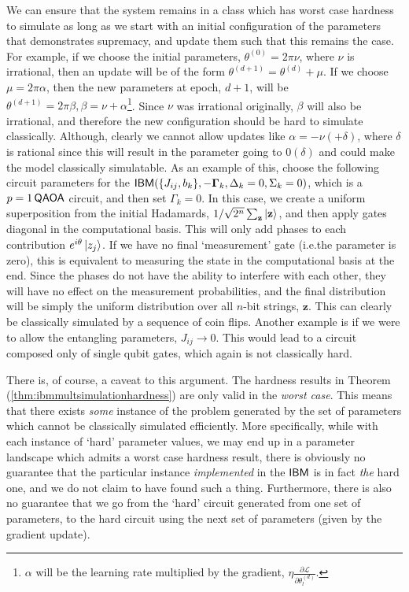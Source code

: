 We can ensure that the system remains in a class which has worst case hardness to simulate as long as we start with an initial configuration of the parameters that demonstrates supremacy, and update them such that this remains the case. For example, if we choose the initial parameters, $\theta^{(0)} = 2\pi\nu$, where $\nu$ is irrational, then an update will be of the form $\theta^{(d+1)} = \theta^{(d)} + \mu$. If we choose $\mu = 2\pi\alpha$, then the new parameters at epoch, $d+1$, will be $\theta^{(d+1)} = 2\pi\beta, \beta = \nu+\alpha$\footnote{$\alpha$ will be the learning rate multiplied by the gradient, $\eta \frac{\partial \mathcal{L}}{\partial \theta^{(d)}_l}$.}. Since $\nu$ was irrational originally, $\beta$ will also be irrational, and therefore the new configuration should be hard to simulate classically. Although, clearly we cannot allow updates like $\alpha = -\nu (+ \delta)$, where $\delta$ is rational since this will result in the parameter going to $0 (\delta)$ and could make the model classically simulatable. As an example of this, choose the following circuit parameters for the $\textsf{IBM}(\{J_{ij}, b_k\}, -\mathbf{\Gamma}_k, \Delta_k = 0, \Sigma_k = 0)$, which is a $p=1 \operatorname{\textsf{QAOA}}$ circuit, and then set $\Gamma_k = 0$. In this case, we create a uniform superposition from the initial Hadamards, $1/\sqrt{2^n}\sum_\mathbf{z}\ket{\mathbf{z}}$, and then apply gates diagonal in the computational basis. This will only add phases to each contribution $e^{i\theta}\ket{z_j}$. If we have no final `measurement' gate (i.e.\@ the parameter is zero), this is equivalent to measuring the state in the computational basis at the end. Since the phases do not have the ability to interfere with each other, they will have no effect on the measurement probabilities, and the final distribution will be simply the uniform distribution over all $n$-bit strings, $\mathbf{z}$. This can clearly be classically simulated by a sequence of coin flips. Another example is if we were to allow the entangling parameters, $J_{ij} \rightarrow 0$. This would lead to a circuit composed only of single qubit gates, which again is not classically hard.

There is, of course, a caveat to this argument. The hardness results in Theorem (\ref{thm:ibmmultsimulationhardness}) are only valid in the \textit{worst case}. This means that there exists \textit{some} instance of the problem generated by the set of parameters which cannot be classically simulated efficiently. More specifically, while with each instance of `hard' parameter values, we may end up in a parameter landscape which admits a worst case hardness result, there is obviously no guarantee that the particular instance \textit{implemented} in the $\textsf{IBM}$ is in fact \textit{the} hard one, and we do not claim to have found such a thing. Furthermore, there is also no guarantee that we go from the `hard' circuit generated from one set of parameters, to the hard circuit using the next set of parameters (given by the gradient update).

